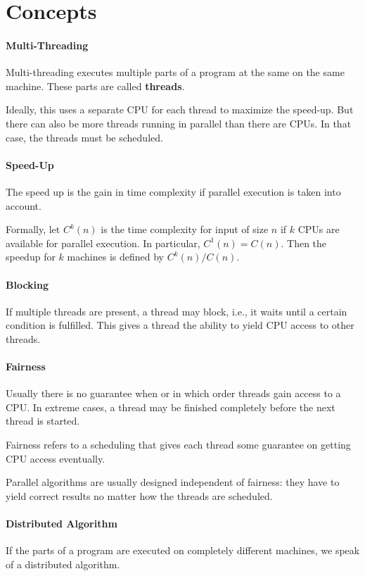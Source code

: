 \section{Concepts}

\paragraph{Multi-Threading}
Multi-threading executes multiple parts of a program at the same on the same machine.
These parts are called \textbf{threads}.

Ideally, this uses a separate CPU for each thread to maximize the speed-up.
But there can also be more threads running in parallel than there are CPUs.
In that case, the threads must be scheduled.

\paragraph{Speed-Up}
The speed up is the gain in time complexity if parallel execution is taken into account.

Formally, let $C^k(n)$ is the time complexity for input of size $n$ if $k$ CPUs are available for parallel execution.
In particular, $C^1(n)=C(n)$.
Then the speedup for $k$ machines is defined by $C^k(n)/C(n)$.

\paragraph{Blocking}
If multiple threads are present, a thread may block, i.e., it waits until a certain condition is fulfilled.
This gives a thread the ability to yield CPU access to other threads.

\paragraph{Fairness}
Usually there is no guarantee when or in which order threads gain access to a CPU.
In extreme cases, a thread may be finished completely before the next thread is started.

Fairness refers to a scheduling that gives each thread some guarantee on getting CPU access eventually.

Parallel algorithms are usually designed independent of fairness: they have to yield correct results no matter how the threads are scheduled.

\paragraph{Distributed Algorithm}
If the parts of a program are executed on completely different machines, we speak of a distributed algorithm.

